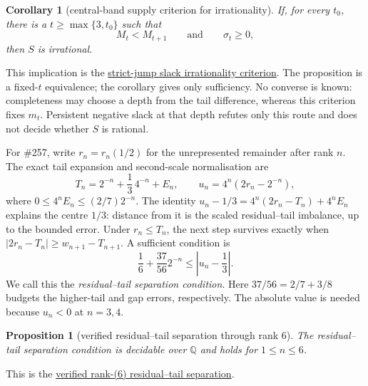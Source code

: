 \documentclass[11pt]{article}
\newcommand{\commit}{99f4bf47422abbd8757cbb22b50ba079d764d3a7}
\newcommand{\repobase}{https://github.com/wcook04/plectis-erdos/blob/\commit}
\newcommand{\PK}{Erdos249257}
\newcommand{\lword}[4]{\href{\repobase/\PK/#1\#L#2}{#4}}
\newtheorem{proposition}[theorem]{Proposition}
\newtheorem{corollary}[theorem]{Corollary}
\theoremstyle{definition}
\theoremstyle{remark}
\newcommand{\Q}{\mathbb{Q}}
\begin{document}
\begin{corollary}[central-band supply criterion for irrationality]
\label{res:slackcriterion}
If, for every $t_0$, there is a $t\ge\max\{3,t_0\}$ such that
\[
 M_t<M_{t+1}\qquad\text{and}\qquad \sigma_t\ge0,
\]
then $S$ is irrational.
\end{corollary}
\noindent This implication is the
\lword{DiagonalFreshLossBridge.lean}{2932}{irrational_totientSeries_of_canonicalAdjacentSuffixJumpSlackSupply}{strict-jump slack irrationality criterion}.
The proposition is a fixed-\(t\) equivalence; the corollary gives only
sufficiency.  No converse is known: completeness may choose a depth from the
tail difference, whereas this criterion fixes \(m_t\).  Persistent negative
slack at that depth refutes only this route and does not decide whether \(S\)
is rational.

For \#257, write \(r_n=r_n(1/2)\) for the unrepresented remainder after rank
\(n\).  The exact tail expansion and second-scale normalisation are
\[
 T_n=2^{-n}+\frac13\,4^{-n}+E_n,
 \qquad u_n=4^n(2r_n-2^{-n}),
\]
where \(0\le4^nE_n\le(2/7)2^{-n}\).  The identity
\(u_n-1/3=4^n(2r_n-T_n)+4^nE_n\) explains the centre \(1/3\): distance from it
is the scaled residual--tail imbalance, up to the bounded error.  Under
\(r_n\le T_n\), the next step survives exactly when
\(\lvert2r_n-T_n\rvert\ge w_{n+1}-T_{n+1}\).  A sufficient condition is
\[
  \frac16+\frac{37}{56}2^{-n}\le \left|u_n-\frac13\right|.
\]
We call this the \emph{residual--tail separation condition}.  Here
\(37/56=2/7+3/8\) budgets the higher-tail and gap errors, respectively.
The absolute value is needed because \(u_n<0\) at \(n=3,4\).

\begin{proposition}[verified residual--tail separation through rank \(6\)]\label{res:secondfrontier}
The residual--tail separation condition is decidable over $\Q$ and holds for
$1\le n\le6$.
\end{proposition}
\noindent This is the
\lword{GreedyAchievementSet.lean}{2973}{halfSecondChannelSeparatedRat_of_pos_le_six}{verified rank-(6) residual--tail separation}.
\end{document}
